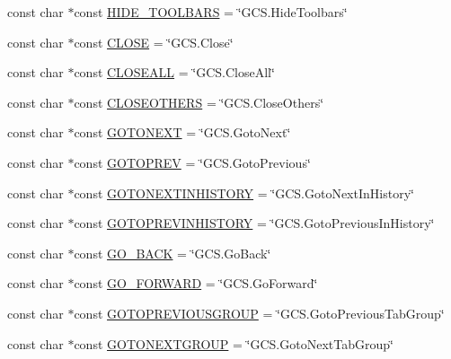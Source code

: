 \begin{DoxyCompactItemize}
\item 
const char $\ast$const \hyperlink{group___core_plugin_ga9f0968263dea29529229d46e5f7cbf68}{H\-I\-D\-E\-\_\-\-T\-O\-O\-L\-B\-A\-R\-S} = \char`\"{}G\-C\-S.\-Hide\-Toolbars\char`\"{}
\item 
const char $\ast$const \hyperlink{group___core_plugin_ga0728832ead190842b8b6a1f54f1db318}{C\-L\-O\-S\-E} = \char`\"{}G\-C\-S.\-Close\char`\"{}
\item 
const char $\ast$const \hyperlink{group___core_plugin_ga18551ff228185c8b7de03d217aa2ad8e}{C\-L\-O\-S\-E\-A\-L\-L} = \char`\"{}G\-C\-S.\-Close\-All\char`\"{}
\item 
const char $\ast$const \hyperlink{group___core_plugin_gac74ced4906f54555abf42a6d3b4b89d7}{C\-L\-O\-S\-E\-O\-T\-H\-E\-R\-S} = \char`\"{}G\-C\-S.\-Close\-Others\char`\"{}
\item 
const char $\ast$const \hyperlink{group___core_plugin_ga76371a58c5ff67166c3ad7c968e7cdae}{G\-O\-T\-O\-N\-E\-X\-T} = \char`\"{}G\-C\-S.\-Goto\-Next\char`\"{}
\item 
const char $\ast$const \hyperlink{group___core_plugin_gaa6384904ccead0ffae9cd0b4e0d39f16}{G\-O\-T\-O\-P\-R\-E\-V} = \char`\"{}G\-C\-S.\-Goto\-Previous\char`\"{}
\item 
const char $\ast$const \hyperlink{group___core_plugin_ga921cce9f88d5e0bf9bba61a202eb9636}{G\-O\-T\-O\-N\-E\-X\-T\-I\-N\-H\-I\-S\-T\-O\-R\-Y} = \char`\"{}G\-C\-S.\-Goto\-Next\-In\-History\char`\"{}
\item 
const char $\ast$const \hyperlink{group___core_plugin_ga53369950e70f551adac3b8d6700a4306}{G\-O\-T\-O\-P\-R\-E\-V\-I\-N\-H\-I\-S\-T\-O\-R\-Y} = \char`\"{}G\-C\-S.\-Goto\-Previous\-In\-History\char`\"{}
\item 
const char $\ast$const \hyperlink{group___core_plugin_ga667d0fdcd552bdbed204a6752c7a297b}{G\-O\-\_\-\-B\-A\-C\-K} = \char`\"{}G\-C\-S.\-Go\-Back\char`\"{}
\item 
const char $\ast$const \hyperlink{group___core_plugin_ga6debdb45bad81e4e19bf8c1c42e0b479}{G\-O\-\_\-\-F\-O\-R\-W\-A\-R\-D} = \char`\"{}G\-C\-S.\-Go\-Forward\char`\"{}
\item 
const char $\ast$const \hyperlink{group___core_plugin_ga2a4d1ddc57f99e31c634a816ce13f02a}{G\-O\-T\-O\-P\-R\-E\-V\-I\-O\-U\-S\-G\-R\-O\-U\-P} = \char`\"{}G\-C\-S.\-Goto\-Previous\-Tab\-Group\char`\"{}
\item 
const char $\ast$const \hyperlink{group___core_plugin_gae62f4649a82a845514a98ad61e2fb37a}{G\-O\-T\-O\-N\-E\-X\-T\-G\-R\-O\-U\-P} = \char`\"{}G\-C\-S.\-Goto\-Next\-Tab\-Group\char`\"{}

\end{DoxyCompactItemize}
